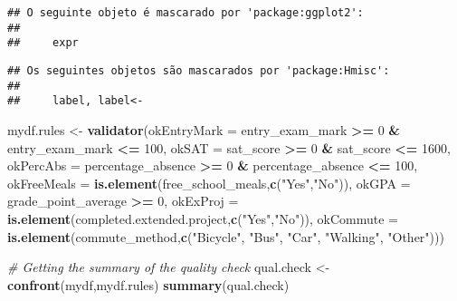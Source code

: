 \documentclass[
]{article}
\newenvironment{Shaded}{\begin{snugshade}}{\end{snugshade}}
\newcommand{\AttributeTok}[1]{\textcolor[rgb]{0.13,0.29,0.53}{#1}}
\newcommand{\CommentTok}[1]{\textcolor[rgb]{0.56,0.35,0.01}{\textit{#1}}}
\newcommand{\DecValTok}[1]{\textcolor[rgb]{0.00,0.00,0.81}{#1}}
\newcommand{\FunctionTok}[1]{\textcolor[rgb]{0.13,0.29,0.53}{\textbf{#1}}}
\newcommand{\NormalTok}[1]{#1}
\newcommand{\OtherTok}[1]{\textcolor[rgb]{0.56,0.35,0.01}{#1}}
\newcommand{\SpecialCharTok}[1]{\textcolor[rgb]{0.81,0.36,0.00}{\textbf{#1}}}
\newcommand{\StringTok}[1]{\textcolor[rgb]{0.31,0.60,0.02}{#1}}
\begin{document}
\begin{verbatim}
## O seguinte objeto é mascarado por 'package:ggplot2':
## 
##     expr
\end{verbatim}

\begin{verbatim}
## Os seguintes objetos são mascarados por 'package:Hmisc':
## 
##     label, label<-
\end{verbatim}

\begin{Shaded}
\begin{Highlighting}[]
\NormalTok{mydf.rules }\OtherTok{\textless{}{-}} \FunctionTok{validator}\NormalTok{(}\AttributeTok{okEntryMark =}\NormalTok{ entry\_exam\_mark }\SpecialCharTok{\textgreater{}=} \DecValTok{0} \SpecialCharTok{\&}\NormalTok{ entry\_exam\_mark }\SpecialCharTok{\textless{}=} \DecValTok{100}\NormalTok{,}
                             \AttributeTok{okSAT =}\NormalTok{ sat\_score }\SpecialCharTok{\textgreater{}=} \DecValTok{0} \SpecialCharTok{\&}\NormalTok{ sat\_score }\SpecialCharTok{\textless{}=} \DecValTok{1600}\NormalTok{,}
                             \AttributeTok{okPercAbs =}\NormalTok{ percentage\_absence }\SpecialCharTok{\textgreater{}=} \DecValTok{0} \SpecialCharTok{\&}\NormalTok{ percentage\_absence }\SpecialCharTok{\textless{}=} \DecValTok{100}\NormalTok{,}
                             \AttributeTok{okFreeMeals =} \FunctionTok{is.element}\NormalTok{(free\_school\_meals,}\FunctionTok{c}\NormalTok{(}\StringTok{"Yes"}\NormalTok{,}\StringTok{"No"}\NormalTok{)),}
                             \AttributeTok{okGPA =}\NormalTok{ grade\_point\_average }\SpecialCharTok{\textgreater{}=} \DecValTok{0}\NormalTok{,}
                             \AttributeTok{okExProj =} \FunctionTok{is.element}\NormalTok{(completed.extended.project,}\FunctionTok{c}\NormalTok{(}\StringTok{"Yes"}\NormalTok{,}\StringTok{"No"}\NormalTok{)),}
                             \AttributeTok{okCommute =} \FunctionTok{is.element}\NormalTok{(commute\_method,}\FunctionTok{c}\NormalTok{(}\StringTok{"Bicycle"}\NormalTok{, }\StringTok{"Bus"}\NormalTok{, }\StringTok{"Car"}\NormalTok{, }\StringTok{"Walking"}\NormalTok{, }\StringTok{"Other"}\NormalTok{)))}
\end{Highlighting}
\end{Shaded}

\begin{Shaded}
\begin{Highlighting}[]
\CommentTok{\# Getting the summary of the quality check}
\NormalTok{qual.check }\OtherTok{\textless{}{-}} \FunctionTok{confront}\NormalTok{(mydf,mydf.rules)}
\FunctionTok{summary}\NormalTok{(qual.check)}
\end{Highlighting}
\end{Shaded}
\end{document}
